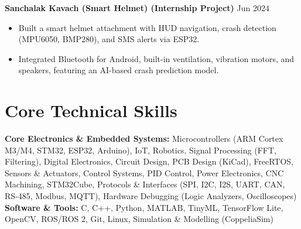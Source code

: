 \documentclass[10pt,a4paper]{article}%
\begin{document}
\noindent \textbf{Sanchalak Kavach (Smart Helmet) (Internship Project)} \hfill Jun 2024%
\begin{itemize}[leftmargin=15pt, nosep, topsep=0pt]%
\item Built a smart helmet attachment with HUD navigation, crash detection (MPU6050, BMP280), and SMS alerts via ESP32.%
\item Integrated Bluetooth for Android, built-in ventilation, vibration motors, and speakers, featuring an AI-based crash prediction model.%
\end{itemize} \vspace{8pt}

\section*{Core Technical Skills}%
\noindent \textbf{Core Electronics \& Embedded Systems:} Microcontrollers (ARM Cortex M3/M4, STM32, ESP32, Arduino), IoT, Robotics, Signal Processing (FFT, Filtering), Digital Electronics, Circuit Design, PCB Design (KiCad), FreeRTOS, Sensors \& Actuators, Control Systems, PID Control, Power Electronics, CNC Machining, STM32Cube, Protocols \& Interfaces (SPI, I2C, I2S, UART, CAN, RS-485, Modbus, MQTT), Hardware Debugging (Logic Analyzers, Oscilloscopes) \vspace{6pt}\\%
\noindent \textbf{Software \& Tools:} C, C++, Python, MATLAB, TinyML, TensorFlow Lite, OpenCV, ROS/ROS 2, Git, Linux, Simulation \& Modelling (CoppeliaSim)%
\end{document}
